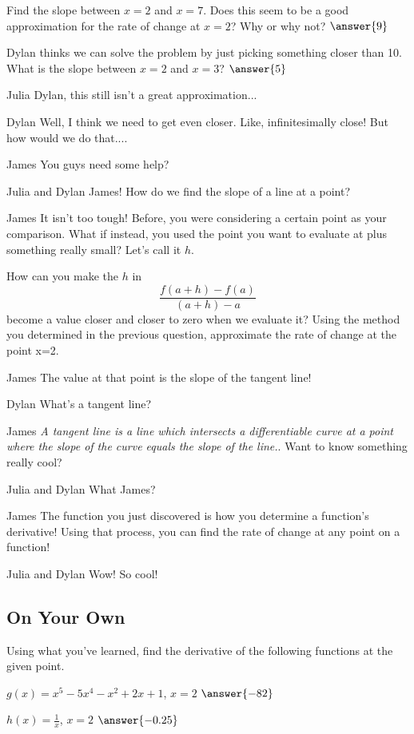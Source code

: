 \documentclass{ximera}
\begin{document}
\begin{question} Find the slope between $x = 2$ and $x = 7$. Does this seem to be a good approximation for the rate of change at $x = 2$? Why or why not? $\answer{9}$ \end{question}
\begin{question}
Dylan thinks we can solve the problem by just picking something closer than 10. What is the slope between $x = 2$ and $x = 3$? $\answer{5}$ 
\end{question}
\begin{dialogue}
\item[Julia] Dylan, this still isn't a great approximation...
\item[Dylan] Well, I think we need to get even closer. Like, infinitesimally close! But how would we do that....
\item[James] You guys need some help?
\item[Julia and Dylan] James! How do we find the slope of a line at a point?
\item[James] It isn't too tough! Before, you were considering a certain point as your comparison. What if instead, you used the point you want to evaluate at plus something really small? Let's call it $h$.
\end{dialogue}
How can you make the $h$ in $$\frac{f(a+h)-f(a)}{(a+h)-a}$$ become a value closer and closer to zero when we evaluate it?
Using the method you determined in the previous question, approximate the rate of change at the point x=2.
\begin{dialogue}
\item[James] The value at that point is the slope of the tangent line!
\item[Dylan] What's a tangent line?
\item[James] \textit{A tangent line is a line which intersects a differentiable curve at a point where the slope of the curve equals the slope of the line.}. Want to know something really cool?
\item[Julia and Dylan] What James?
\item[James] The function you just discovered is how you determine a function's derivative! Using that process, you can find the rate of change at any point on a function!
\item[Julia and Dylan] Wow! So cool!
\end{dialogue}

\subsection{On Your Own}
Using what you've learned, find the derivative of the following functions at the given point.
\setcounter{problem}{0}
\begin{question}
$g(x) = x^5-5x^4-x^2+2x+1$, $x=2$ $\answer{-82}$
\end{question}
\begin{question}
$h(x) = \frac{1}{x}$, $x=2$ $\answer{-0.25}$
\end{question}
\end{document}
